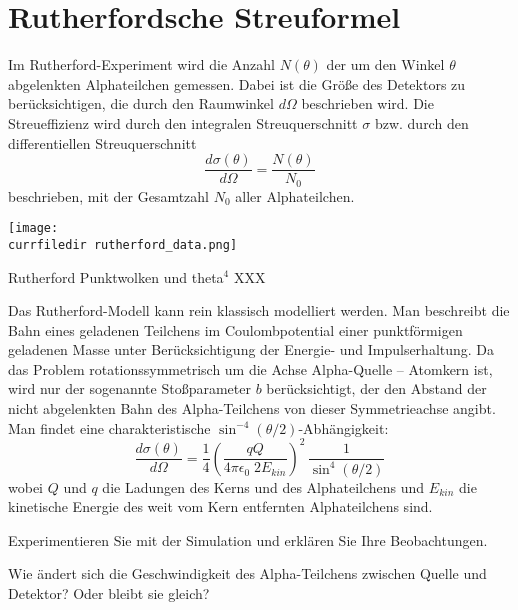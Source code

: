 \section{Rutherfordsche Streuformel}

Im Rutherford-Experiment wird die Anzahl $N(\theta)$ der um den Winkel $\theta$ abgelenkten Alphateilchen gemessen. Dabei ist die Größe des Detektors zu berücksichtigen, die durch den Raumwinkel $d\Omega$ beschrieben wird. Die Streueffizienz wird durch den integralen Streuquerschnitt $\sigma$ bzw. durch den differentiellen Streuquerschnitt  
\begin{equation}
    \frac{d \sigma(\theta)}{d\Omega} = \frac{N(\theta)}{N_0}
\end{equation}
beschrieben, mit der Gesamtzahl $N_0$ aller Alphateilchen.

\begin{marginfigure}
    \texttt{[image: \\currfiledir rutherford\_data.png]}
    \caption{Rutherford Punktwolken und theta$^4$ XXX}
\end{marginfigure}



Das Rutherford-Modell kann rein klassisch modelliert werden. Man beschreibt die Bahn eines geladenen Teilchens im Coulombpotential einer punktförmigen geladenen Masse unter Berücksichtigung der Energie- und Impulserhaltung. Da das Problem rotationssymmetrisch um die Achse Alpha-Quelle -- Atomkern ist, wird nur der sogenannte Stoßparameter $b$ berücksichtigt, der den Abstand der nicht abgelenkten Bahn des Alpha-Teilchens von dieser Symmetrieachse angibt. Man findet  eine charakteristische $\sin^{-4} (\theta/2)$-Abhängigkeit:
\begin{equation}
    \frac{d \sigma(\theta)}{d\Omega} =
    \frac{1}{4} \left(
\frac{qQ}{4 \pi \epsilon_0 \; 2 E_{kin}}
    \right)^2 \, \frac{1}{\sin^4 (\theta/2)}
\end{equation}
wobei $Q$ und $q$ die Ladungen des Kerns und des Alphateilchens und $E_{kin}$ die kinetische Energie des weit vom Kern entfernten Alphateilchens sind.

\begin{questions}  
    \item Experimentieren Sie mit der Simulation und erklären Sie Ihre Beobachtungen.
    \item Wie ändert sich die Geschwindigkeit des Alpha-Teilchens zwischen Quelle und Detektor? Oder bleibt sie gleich?
\end{questions}


